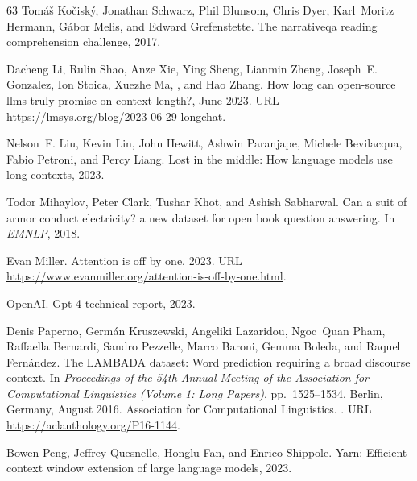 \documentclass{article} \usepackage{iclr2024_conference,times}
\begin{document}
\begin{thebibliography}{63}
Tomáš Kočiský, Jonathan Schwarz, Phil Blunsom, Chris Dyer, Karl~Moritz
  Hermann, Gábor Melis, and Edward Grefenstette.
\newblock The narrativeqa reading comprehension challenge, 2017.

Dacheng Li, Rulin Shao, Anze Xie, Ying Sheng, Lianmin Zheng, Joseph~E.
  Gonzalez, Ion Stoica, Xuezhe Ma, , and Hao Zhang.
\newblock How long can open-source llms truly promise on context length?, June
  2023.
\newblock URL \url{https://lmsys.org/blog/2023-06-29-longchat}.

Nelson~F. Liu, Kevin Lin, John Hewitt, Ashwin Paranjape, Michele Bevilacqua,
  Fabio Petroni, and Percy Liang.
\newblock Lost in the middle: How language models use long contexts, 2023.

Todor Mihaylov, Peter Clark, Tushar Khot, and Ashish Sabharwal.
\newblock Can a suit of armor conduct electricity? a new dataset for open book
  question answering.
\newblock In \emph{EMNLP}, 2018.

Evan Miller.
\newblock Attention is off by one, 2023.
\newblock URL \url{https://www.evanmiller.org/attention-is-off-by-one.html}.

OpenAI.
\newblock Gpt-4 technical report, 2023.

Denis Paperno, Germ{\'a}n Kruszewski, Angeliki Lazaridou, Ngoc~Quan Pham,
  Raffaella Bernardi, Sandro Pezzelle, Marco Baroni, Gemma Boleda, and Raquel
  Fern{\'a}ndez.
\newblock The {LAMBADA} dataset: Word prediction requiring a broad discourse
  context.
\newblock In \emph{Proceedings of the 54th Annual Meeting of the Association
  for Computational Linguistics (Volume 1: Long Papers)}, pp.\  1525--1534,
  Berlin, Germany, August 2016. Association for Computational Linguistics.
\newblock {}.
\newblock URL \url{https://aclanthology.org/P16-1144}.

Bowen Peng, Jeffrey Quesnelle, Honglu Fan, and Enrico Shippole.
\newblock Yarn: Efficient context window extension of large language models,
  2023.


\end{thebibliography}
\end{document}
